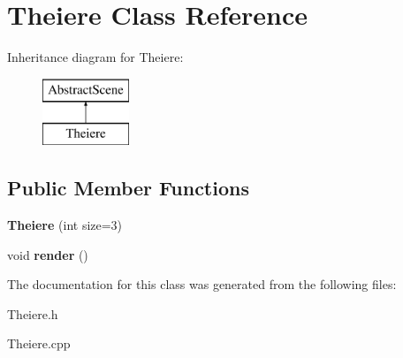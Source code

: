 \hypertarget{classTheiere}{}\section{Theiere Class Reference}
\label{classTheiere}
Inheritance diagram for Theiere\+:\begin{figure}[H]
\begin{center}
\leavevmode
\includegraphics[height=2.000000cm]{classTheiere}
\end{center}
\end{figure}
\subsection*{Public Member Functions}
\begin{DoxyCompactItemize}
\item 
\mbox{\label{classTheiere_a877b7db6139ab75aa4c0d1926c1b6429}} 
{\bfseries Theiere} (int size=3)
\item 
\mbox{\label{classTheiere_ae37d040208611105164a70fcc811c3b3}} 
void {\bfseries render} ()
\end{DoxyCompactItemize}


The documentation for this class was generated from the following files\+:\begin{DoxyCompactItemize}
\item 
Theiere.\+h\item 
Theiere.\+cpp\end{DoxyCompactItemize}
